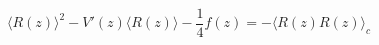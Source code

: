 \begin{equation}
\langle R(z) \rangle^2 - V'(z)\langle R(z) \rangle - \frac{1}{4}f(z)
= -\langle R(z) R(z) \rangle_c 
\label{Req}
\end{equation}

